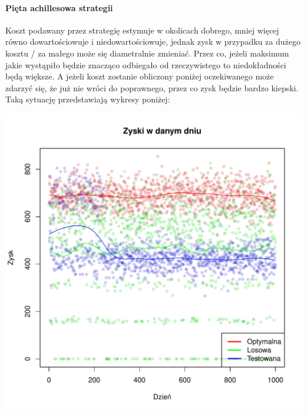 \documentclass{article}
\begin{document}
\paragraph{Pięta achillesowa strategii}
Koszt podawany przez strategię estymuje w okolicach dobrego, mniej więcej równo dowartościowuje i
niedowartościowuje, jednak zysk w przypadku za dużego kosztu / za małego może się diametralnie zmieniać. Przez co,
jeżeli maksimum jakie wystąpiło będzie znacząco odbiegało od rzeczywistego to niedokładności będą większe. 
A jeżeli koszt zostanie obliczony poniżej oczekiwanego może zdarzyć się, że już nie wróci do poprawnego, przez co zysk będzie bardzo
kiepski. Taką sytuację przedstawiają wykresy poniżej:
\begin{center}
\includegraphics[scale=0.52]{wykresy/problemy/Zysk_strategii_porownanie_koszt_troche_za_maly.pdf}
\end{center}
\end{document}
